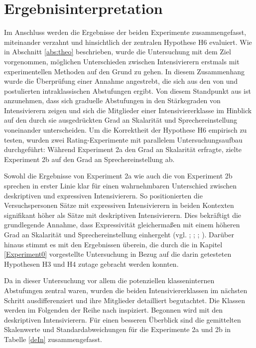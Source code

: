 \section{Ergebnisinterpretation}\label{abs:Gesamtdiskussion}
Im Anschluss werden die Ergebnisse der beiden Experimente zusammengefasst, miteinander verzahnt und hinsichtlich der zentralen {Hypothese H6} evaluiert. Wie in Abschnitt \ref{abs:theo} beschrieben, wurde die Untersuchung mit dem Ziel vorgenommen, möglichen Unterschieden zwischen Intensivierern erstmals mit experimentellen Methoden auf den Grund zu gehen. In diesem Zusammenhang wurde die Überprüfung einer Annahme angestrebt, die sich aus den von {\citet[87]{Biedermann.1969}} und \citet[408]{Breindl.2007} postulierten intraklassischen Abstufungen ergibt. Von diesem Standpunkt aus ist anzunehmen, dass sich graduelle Abstufungen in den Stärkegraden von Intensivierern zeigen und sich die Mitglieder einer Intensiviererklasse im Hinblick auf den durch sie ausgedrückten Grad an Skalarität und Sprechereinstellung voneinander unterscheiden. Um die Korrektheit der {Hypothese H6} empirisch zu testen, wurden zwei Rating-Experimente mit parallelem Untersuchungsaufbau durchgeführt: Während {Experiment 2a} den Grad an Skalarität erfragte, zielte {Experiment 2b} auf den Grad an {Sprechereinstellung ab}.


Sowohl die Ergebnisse von Experiment 2a wie auch die von {Experiment 2b} sprechen in erster Linie klar für einen wahrnehmbaren Unterschied zwischen deskriptiven und expressiven Intensivierern. So positionierten die Versuchspersonen Sätze mit expressiven Intensivierern in beiden Kontexten signifikant höher als Sätze mit deskriptiven Intensivierern. Dies bekräftigt die grundlegende Annahme, dass Expressivität gleichermaßen mit einem höheren Grad an Skalarität und Sprechereinstellung einhergeht (vgl. {\citealt[315]{Lang.1983}}; \citealt[22]{Paradis.1997}; {\citealt[57]{Ortner.2014}}; {\citealt[133]{Gutzmann.2019a}}). Darüber hinaus stimmt es mit den Ergebnissen überein, die durch die in Kapitel \ref{Experiment0} vorgestellte Untersuchung in Bezug auf die darin getesteten Hypothesen H3 und H4 zutage gebracht werden konnten.


Da in dieser Untersuchung vor allem die potenziellen klasseninternen Abstufungen zentral waren, wurden die beiden Intensiviererklassen im nächsten Schritt ausdifferenziert und ihre Mitglieder detailliert begutachtet. Die Klassen werden im Folgenden der Reihe nach inspiziert. Begonnen wird mit den deskriptiven Intensivierern. Für einen besseren Überblick sind die gemittelten Skalenwerte und Standardabweichungen für die {Experimente 2a und 2b} in {Tabelle \ref{deIn}} zusammengefasst.


